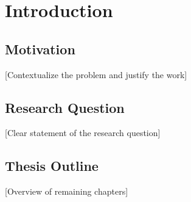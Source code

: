 \chapter{Introduction}

\section{Motivation}

[Contextualize the problem and justify the work]

\section{Research Question}

[Clear statement of the research question]

\section{Thesis Outline}

[Overview of remaining chapters]
